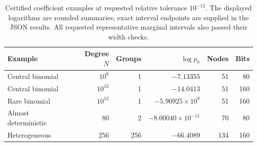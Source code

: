 \begin{table}[H]
\centering\small
\begin{tabular}{@{}lrrrrr@{}}
\toprule
Example & Degree $N$ & Groups & $\log p_k$ & Nodes & Bits \\
\midrule
Central binomial & $10^{6}$ & 1 & $-7.13355$ & 51 & 80 \\
Central binomial & $10^{12}$ & 1 & $-14.0413$ & 51 & 160 \\
Rare binomial & $10^{12}$ & 1 & $-5.90925\times10^{9}$ & 51 & 160 \\
Almost deterministic & 80 & 2 & $-8.00040\times10^{-11}$ & 70 & 80 \\
Heterogeneous & 256 & 256 & $-66.4089$ & 134 & 160 \\
\bottomrule
\end{tabular}
\caption{Certified coefficient examples at requested relative tolerance $10^{-12}$. The displayed logarithms are rounded summaries; exact interval endpoints are supplied in the JSON results. All requested representative marginal intervals also passed their width checks.}
\label{tab:coefficientexamples}
\end{table}
